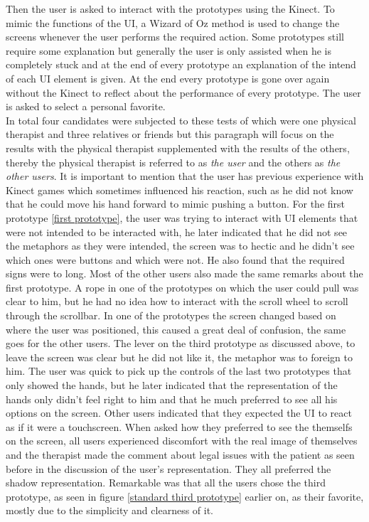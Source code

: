Then the user is asked to interact with the prototypes using the Kinect. To mimic the functions of the UI, a Wizard of Oz method is used to change the screens whenever the user performs the required action. Some prototypes still require some explanation but generally the user is only assisted when he is completely stuck and at the end of every prototype an explanation of the intend of each UI element is given. At the end every prototype is gone over again without the Kinect to reflect about the performance of every prototype. The user is asked to select a personal favorite.\\

In total four candidates were subjected to these tests of which were one physical therapist and three relatives or friends but this paragraph will focus on the results with the physical therapist supplemented with the results of the others, thereby the physical therapist is referred to as \emph{the user} and the others as \emph{the other users}. It is important to mention that the user has previous experience with Kinect games which sometimes influenced his reaction, such as he did not know that he could move his hand forward to mimic pushing a button. For the first prototype  \ref{first prototype}, the user was trying to interact with UI elements that were not intended to be interacted with, he later indicated that he did not see the metaphors as they were intended, the screen was to hectic and he didn't see which ones were buttons and which were not. He also found that the required signs were to long. Most of the other users also made the same remarks about the first prototype. A rope in one of the prototypes on which the user could pull was clear to him, but he had no idea how to interact with the scroll wheel to scroll through the scrollbar. In one of the prototypes the screen changed based on where the user was positioned, this caused a great deal of confusion, the same goes for the other users. The lever on the third prototype as discussed above, to leave the screen was clear but he did not like it, the metaphor was to foreign to him. The user was quick to pick up the controls of the last two prototypes that only showed the hands, but he later indicated that the representation of the hands only didn't feel right to him and that he much preferred to see all his options on the screen. Other users indicated that they expected the UI to react as if it were a touchscreen. When asked how they preferred to see the themselfs on the screen, all users experienced discomfort with the real image of themselves and the therapist made the comment about legal issues with the patient as seen before in the discussion of the user's representation. They all preferred the shadow representation.  Remarkable was that all the users chose the third prototype, as seen in figure \ref{standard third prototype} earlier on, as their favorite, mostly due to the simplicity and clearness of it.

